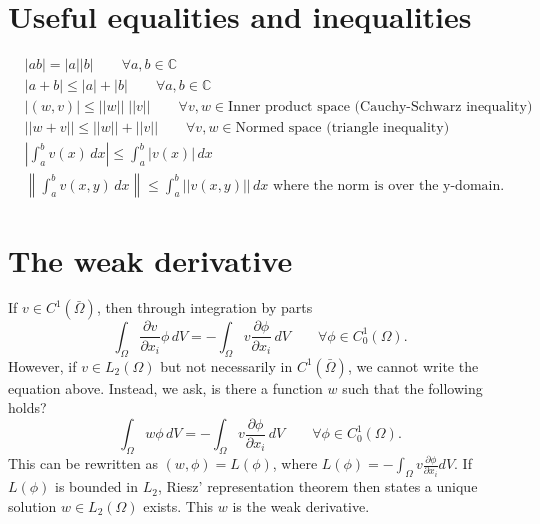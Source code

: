 \documentclass[oneside,a4paper,11pt]{report}
\begin{document}
\section{Useful equalities and inequalities}
\begin{align}
    &|ab| = |a||b| \qquad \forall a,b \in \mathbb{C} \\
    &|a + b| \le |a| + |b| \qquad \forall a,b \in \mathbb{C} \\
    &|(w,v)| \le ||w||\;||v|| \qquad \forall v,w \in \text{Inner product space (Cauchy-Schwarz inequality)} \\
    &||w + v|| \le ||w|| + ||v|| \qquad \forall v,w \in \text{Normed space (triangle inequality)} \\
    &\left | \int_a^b v(x) \, dx \right| \le \int_a^b |v(x)| \, dx \\
    &\left \| \int_a^b v(x,y) \, dx \right \| \le \int_a^b ||v(x,y)|| \, dx \text{ where the norm is over the y-domain}.
\end{align}

\section{The weak derivative}
If $v \in C^1(\bar{\Omega})$, then through integration by parts
\begin{equation}
    \int_\Omega \frac{\partial v}{\partial x_i} \phi \, dV = -\int_\Omega v \frac{\partial \phi}{\partial x_i} \, dV \qquad \forall \phi \in C_0^1(\Omega).
\end{equation}
However, if $v \in L_2(\Omega)$ but not necessarily in $C^1(\bar{\Omega})$, we cannot write the equation above. Instead, we ask, is there a function $w$ such that the following holds?
\begin{equation}
     \int_\Omega w \phi \, dV = -\int_\Omega v \frac{\partial \phi}{\partial x_i} \, dV \qquad \forall \phi \in C_0^1(\Omega).
\end{equation}
This can be rewritten as $(w,\phi) = L(\phi)$, where $L(\phi) = -\int_\Omega v \frac{\partial \phi}{\partial x_i} dV$. If $L(\phi)$ is bounded in $L_2$, Riesz' representation theorem then states a unique solution $w \in L_2(\Omega)$ exists. This $w$ is the weak derivative.
\end{document}
